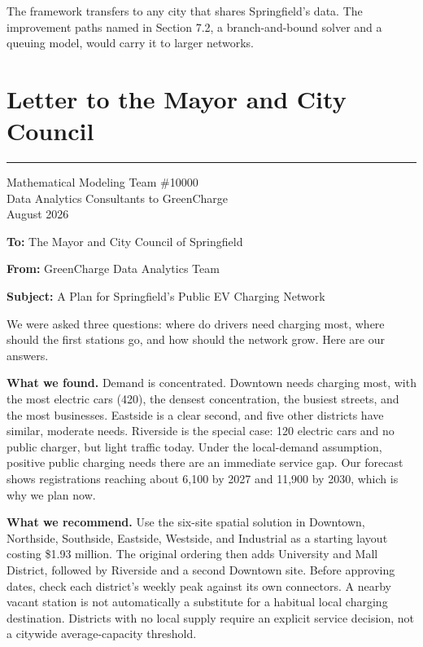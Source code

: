 \documentclass[12pt]{article}
\begin{document}
The framework transfers to any city that shares Springfield's data. The improvement paths
named in Section 7.2, a branch-and-bound solver and a queuing model, would carry it to
larger networks.

\newpage

\section*{Letter to the Mayor and City Council}

\vspace{4pt}
\hrule
\vspace{6pt}

\begin{flushright}
Mathematical Modeling Team \#10000 \\
Data Analytics Consultants to GreenCharge \\
August 2026 \\
\end{flushright}

\vspace{2pt}

\textbf{To:} The Mayor and City Council of Springfield

\textbf{From:} GreenCharge Data Analytics Team

\textbf{Subject:} A Plan for Springfield's Public EV Charging Network

\vspace{6pt}

We were asked three questions: where do drivers need charging most, where should the
first stations go, and how should the network grow. Here are our answers.

\textbf{What we found.} Demand is concentrated. Downtown needs charging most, with the most
electric cars (420), the densest concentration, the busiest streets, and the most
businesses. Eastside is a clear second, and five other districts have similar, moderate
needs. Riverside is the special case: 120 electric cars and no public charger, but light
traffic today. Under the local-demand assumption, positive public charging needs there
are an immediate service gap. Our forecast
shows registrations reaching about 6,100 by 2027 and 11,900 by 2030, which is why we plan
now.

\textbf{What we recommend.} Use the six-site spatial solution in Downtown, Northside,
Southside, Eastside, Westside, and Industrial as a starting layout costing \$1.93 million.
The original ordering then adds University and Mall District, followed by Riverside and
a second Downtown site. Before approving dates, check each district's weekly peak against
its own connectors. A nearby vacant station is not automatically a substitute for a
habitual local charging destination. Districts with no local supply require an explicit
service decision, not a citywide average-capacity threshold.
\end{document}
